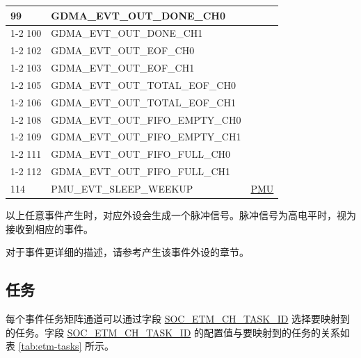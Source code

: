 \documentclass[main\_\_CN.tex]{subfiles}
\begin{document}
\begin{longtable}{ | l | l | l | }
99 & GDMA\_EVT\_OUT\_DONE\_CH0 & \\ \cline{1-2}
100 & GDMA\_EVT\_OUT\_DONE\_CH1 & \\ \cline{1-2}
102 & GDMA\_EVT\_OUT\_EOF\_CH0  & \\ \cline{1-2}
103 & GDMA\_EVT\_OUT\_EOF\_CH1  & \\ \cline{1-2}
105 & GDMA\_EVT\_OUT\_TOTAL\_EOF\_CH0  & \\ \cline{1-2}
106 & GDMA\_EVT\_OUT\_TOTAL\_EOF\_CH1  & \\ \cline{1-2}
108 & GDMA\_EVT\_OUT\_FIFO\_EMPTY\_CH0 & \\ \cline{1-2}
109 & GDMA\_EVT\_OUT\_FIFO\_EMPTY\_CH1 & \\ \cline{1-2}
111 & GDMA\_EVT\_OUT\_FIFO\_FULL\_CH0  & \\ \cline{1-2}
112 & GDMA\_EVT\_OUT\_FIFO\_FULL\_CH1  & \\ \hline
114 & PMU\_EVT\_SLEEP\_WEEKUP   & \hyperref[mod:lowpowm]{PMU} \\ \hline
\end{longtable}

以上任意事件产生时，对应外设会生成一个脉冲信号。脉冲信号为高电平时，视为接收到相应的事件。

对于事件更详细的描述，请参考产生该事件外设的章节。

\subsection{任务}
\label{sec:evntaskmatrix-tasks}

每个事件任务矩阵通道可以通过字段 \hyperref[fielddesc:SOCETMCH0TASKID]{SOC\_ETM\_CH\_TASK\_ID} 选择要映射到的任务。字段 \hyperref[fielddesc:SOCETMCH0TASKID]{SOC\_ETM\_CH\_TASK\_ID} 的配置值与要映射到的任务的关系如表 \ref{tab:etm-tasks} 所示。
\end{document}
